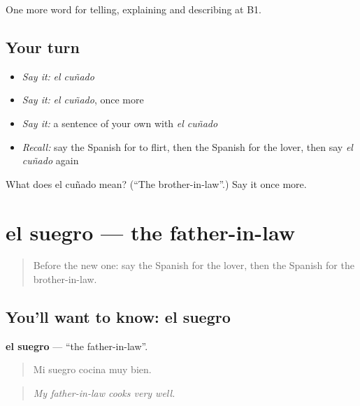 \begin{grammarlens}[title={What you've built}]
One more word for telling, explaining and describing at B1.
\end{grammarlens}

\subsection*{Your turn}
\begin{itemize}
\raggedright
  \item \emph{Say it:} \emph{el cuñado}
  \item \emph{Say it:} \emph{el cuñado}, once more
  \item \emph{Say it:} a sentence of your own with \emph{el cuñado}
  \item \emph{Recall:} say the Spanish for to flirt, then the Spanish for the lover, then say \emph{el cuñado} again
\end{itemize}

\begin{tcolorbox}[breakable,colback=teal!4,colframe=teal!35!black,title={Before you move on}]
What does el cuñado mean? (\textquotedblleft{}The brother-in-law\textquotedblright{}.) Say it once more.
\end{tcolorbox}
\section[el suegro]{el suegro — the father-in-law}

\label{lesson:ES-C747-suegro}



\begin{quote}
Before the new one: say the Spanish for the lover, then the Spanish for the brother-in-law.
\end{quote}

\subsection*{You'll want to know: el suegro}
\textbf{el suegro} — \textquotedblleft{}the father-in-law\textquotedblright{}.

\begin{quote}
Mi suegro cocina muy bien.
\end{quote}

\begin{quote}
\emph{My father-in-law cooks very well.}
\end{quote}

